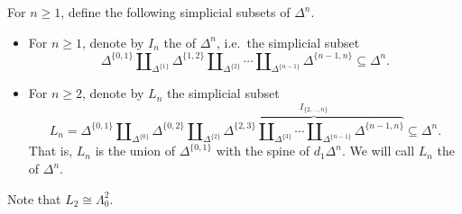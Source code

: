 \documentclass[main.tex]{subfiles}
\begin{document}
\begin{definition}
  For $n \geq 1$, define the following simplicial subsets of $\Delta^{n}$.

  \begin{itemize}
    \item For $n \geq 1$, denote by $I_{n}$ the  of $\Delta^{n}$, i.e.\ the simplicial subset
      \begin{equation*}
        \Delta^{\{0, 1\}} \amalg_{\Delta^{\{1\}}} \Delta^{\{1, 2\}} \amalg_{\Delta^{\{2\}}} \cdots \amalg_{\Delta^{\{n-1\}}} \Delta^{\{n-1, n\}} \subseteq \Delta^{n}.
      \end{equation*}

    \item For $n \geq 2$, denote by $L_{n}$ the simplicial subset
      \begin{equation*}
        L_{n} = \Delta^{\{0, 1\}} \amalg_{\Delta^{\{0\}}} \Delta^{\{0, 2\}} \amalg_{\Delta^{\{2\}}} \overbrace{\Delta^{\{2, 3\}} \amalg_{\Delta^{\{3\}}}\cdots \amalg_{\Delta^{\{n-1\}}} \Delta^{\{n-1, n\}}}^{I_{\{2, \ldots, n\}}} \subseteq \Delta^{n}.
      \end{equation*}
      That is, $L_{n}$ is the union of $\Delta^{\{0, 1\}}$ with the spine of $d_{1}\Delta^{n}$. We will call $L_{n}$ the  of $\Delta^{n}$.
  \end{itemize}
\end{definition}

Note that $L_{2} \cong \Lambda^{2}_{0}$.

\end{document}
